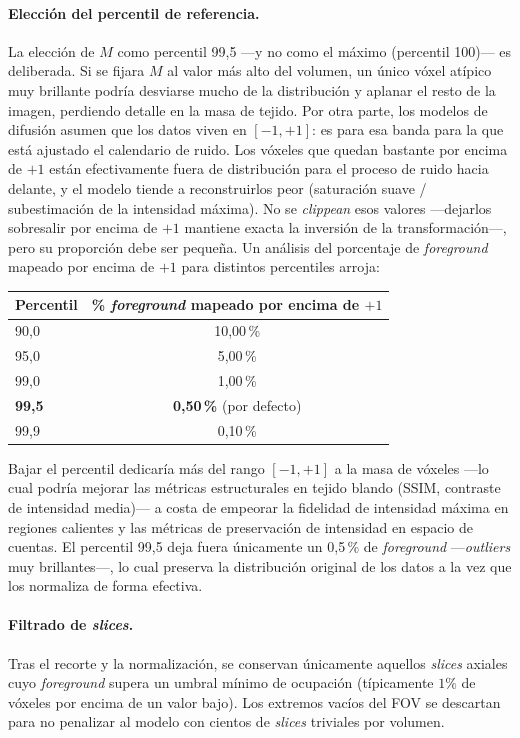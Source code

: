 \paragraph{Elección del percentil de referencia.}
La elección de $M$ como percentil 99,5 —y no como el máximo
(percentil 100)— es deliberada. Si se fijara $M$ al valor más alto
del volumen, un único vóxel atípico muy brillante podría
desviarse mucho de la distribución y aplanar el resto de la
imagen, perdiendo detalle en la masa de tejido. Por otra parte,
los modelos de difusión asumen que los datos viven en $[-1, +1]$:
es para esa banda para la que está ajustado el calendario de
ruido. Los vóxeles que quedan bastante por encima de $+1$ están
efectivamente fuera de distribución para el proceso de ruido hacia
delante, y el modelo tiende a reconstruirlos peor (saturación
suave / subestimación de la intensidad máxima). No se
\textit{clippean} esos valores —dejarlos sobresalir por encima de
$+1$ mantiene exacta la inversión de la transformación—, pero su
proporción debe ser pequeña. Un análisis del porcentaje de
\textit{foreground} mapeado por encima de $+1$ para distintos
percentiles arroja:
\begin{center}
\begin{tabular}{lc}
\toprule
Percentil & \% \textit{foreground} mapeado por encima de $+1$ \\
\midrule
90{,}0 & 10{,}00\,\% \\
95{,}0 & 5{,}00\,\% \\
99{,}0 & 1{,}00\,\% \\
\textbf{99{,}5} & \textbf{0{,}50\,\%} (por defecto) \\
99{,}9 & 0{,}10\,\% \\
\bottomrule
\end{tabular}
\end{center}
Bajar el percentil dedicaría más del rango $[-1, +1]$ a la masa
de vóxeles —lo cual podría mejorar las métricas estructurales en
tejido blando (SSIM, contraste de intensidad media)— a costa de
empeorar la fidelidad de intensidad máxima en regiones calientes
y las métricas de preservación de intensidad en espacio de
cuentas. El percentil 99,5 deja fuera únicamente un 0,5\,\% de
\textit{foreground} —\textit{outliers} muy brillantes—, lo cual
preserva la distribución original de los datos a la vez que los
normaliza de forma efectiva.

\paragraph{Filtrado de \textit{slices}.}
Tras el recorte y la normalización, se conservan únicamente
aquellos \textit{slices} axiales cuyo \textit{foreground} supera
un umbral mínimo de ocupación (típicamente $1\%$ de vóxeles por
encima de un valor bajo). Los extremos vacíos del FOV se descartan
para no penalizar al modelo con cientos de \textit{slices}
triviales por volumen.

